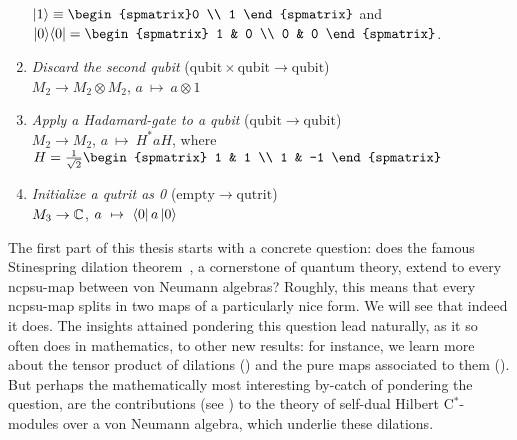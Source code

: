 \documentclass[b]{subfiles}
\begin{document}
\begin{parsec}
\begin{point}
\begin{point}
\begin{enumerate}
{            $\ket{1}\equiv\begin{spmatrix}0 \\ 1 \end{spmatrix}$ and
                $\ketbra{0}{0} = \begin{spmatrix} 1 & 0
                \\ 0 & 0 \end{spmatrix}$.}
\item
    \emph{Discard the second qubit} \quad
            ($\mathrm{qubit} \times \mathrm{qubit}\to \mathrm{qubit}$) \\
        $M_2 \rightarrow M_2 \otimes M_2$, \quad
        $a \ \mapsto \ a \otimes 1$
\item
    \emph{Apply a Hadamard-gate to a qubit} \quad
            ($\mathrm{qubit} \to \mathrm{qubit}$) \\
        $M_2 \rightarrow M_2$, \quad
        $a \ \mapsto \ H^*a H $, \quad where~$H = \frac{1}{\sqrt{2}}\begin{spmatrix}
            1 & 1 \\ 1 & -1
        \end{spmatrix}$
\item
    \emph{Initialize a qutrit as 0} \quad
            ($\mathrm{empty} \to \mathrm{qutrit}$) \\
        $M_3 \rightarrow \mathbb{C}$, \quad
        $a \ \mapsto \ \bra{0}a\ket{0}$
\end{enumerate}
\end{point}
\begin{point}%
The first part of this thesis starts with a concrete question:
    does the famous  Stinespring dilation theorem~\cite{stinespring},
    a cornerstone of quantum theory,
    extend to every ncpsu-map between von Neumann algebras?
Roughly, this means that every ncpsu-map  splits
    in two maps of a particularly nice form.
We will see that indeed it does.
The insights attained pondering this question lead naturally,
        as it so often does in mathematics, to other new results:
    for instance, we learn more about  the tensor product of
    dilations ()
        and the pure maps associated to them ().
But perhaps the mathematically
    most interesting by-catch of pondering the question,
    are the contributions (see ) to the theory
    of self-dual Hilbert C$^*$-modules over a von Neumann algebra,
    which underlie these dilations.
\end{point}
\begin{point}%

\end{point}
\end{point}
\end{parsec}
\end{document}

